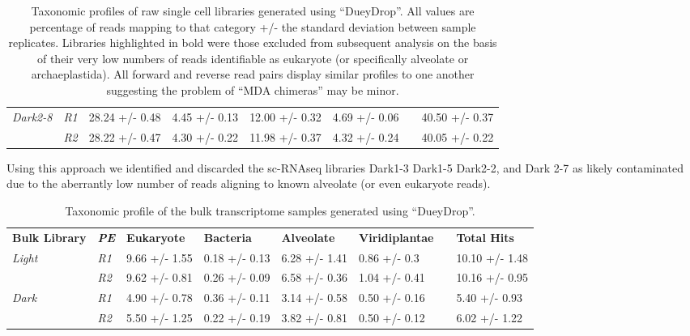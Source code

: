 \begin{table}[h]
\begin{tabular}{|l|l|l|l|l|l|l|l|}
         \textit{Dark2-8}     & \textit{R1}                   & 28.24 +/- 0.48     & 4.45 +/- 0.13     & 12.00 +/- 0.32     & 4.69 +/- 0.06          &  & 40.50 +/- 0.37      \\ \cmidrule(lr){2-2}
                              & \textit{R2}                   & 28.22 +/- 0.47     & 4.30 +/- 0.22     & 11.98 +/- 0.37     & 4.32 +/- 0.24          &  & 40.05 +/- 0.22      \\ \cmidrule(r){1-6} \cmidrule(l){8-8} 
     \end{tabular}
     \caption{Taxonomic profiles of raw single cell libraries generated using ``DueyDrop''. All values are percentage of reads mapping to that category +/- the standard deviation between sample replicates.  Libraries
     highlighted in bold were those excluded from subsequent analysis on the basis of their very low numbers of reads identifiable as 
 eukaryote (or specifically alveolate or archaeplastida). All forward and reverse read pairs display similar profiles to one another suggesting
 the problem of ``MDA chimeras'' may be minor.}
 \label{tab:sct_duey}
\end{table}

Using this approach we identified and discarded the sc-RNAseq libraries Dark1-3 Dark1-5 Dark2-2, and Dark 2-7 as likely contaminated 
due to the aberrantly low number of reads aligning to known alveolate (or even eukaryote reads).  





\begin{table}[h]
     \begin{tabular}{@{}|l|l|l|l|l|l|l|l|@{}}
         \cmidrule(r){1-6} \cmidrule(l){8-8}
         \textbf{Bulk Library} & \textit{\textbf{PE}} & \textbf{Eukaryote} & \textbf{Bacteria} & \textbf{Alveolate} & \textbf{Viridiplantae} &  & \textbf{Total Hits} \\ \cmidrule(r){1-6} \cmidrule(l){8-8} 
         \textit{Light}    & \textit{R1}              &  9.66 +/- 1.55     & 0.18 +/- 0.13     &  6.28 +/- 1.41     &  0.86 +/- 0.3          &  &  10.10 +/- 1.48       \\ \cmidrule(lr){2-2}
                              & \textit{R2}           &  9.62 +/- 0.81     & 0.26 +/- 0.09    &  6.58 +/- 0.36     &  1.04 +/- 0.41         &  &  10.16 +/- 0.95      \\ \cmidrule(r){1-6} \cmidrule(l){8-8} 
         \textit{Dark}   & \textit{R1}                &  4.90 +/- 0.78     & 0.36 +/- 0.11    &  3.14 +/- 0.58     &  0.50 +/- 0.16        &  &  5.40 +/- 0.93      \\ \cmidrule(lr){2-2}
                              & \textit{R2}           &  5.50 +/- 1.25     & 0.22 +/- 0.19   &  3.82 +/- 0.81     &  0.50 +/- 0.12         &  &  6.02 +/- 1.22      \\ \cmidrule(r){1-6} \cmidrule(l){8-8} 
    \end{tabular}
    \caption{Taxonomic profile of the bulk transcriptome samples generated using ``DueyDrop''.}
    \label{tab:bulk_duey}
\end{table}



